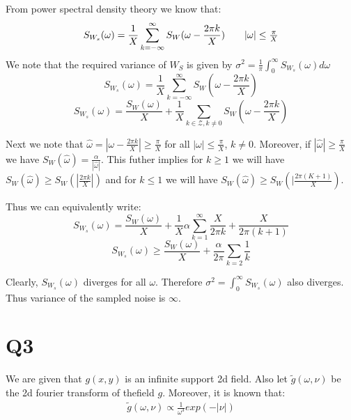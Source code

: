 \documentclass{article}
\begin{document}
From power spectral density theory we know that:
\begin{align}
  \label{eq:psd1}
  S_{W_s}(\omega) = \frac{1}{X}\sum_{k=-\infty}^{\infty}S_W(\omega - \frac{2\pi k}{X}) \tag*{$|\omega| \le \frac{\pi}{X}$}
\end{align}
We note that the required variance of $W_S$ is given by $\sigma^2 = \frac{1}{\pi} \int_{0}^{\infty}S_{W_s}(\omega)d\omega$
$$S_{W_s}(\omega) = \frac{1}{X} \sum_{k=-\infty}^{\infty}S_W(\omega - \frac{2\pi k}{X})$$
$$S_{W_s}(\omega) = \frac{S_W(\omega)}{X} + \frac{1}{X} \sum_{k \in \mathcal{Z}, k \ne 0} S_W(\omega - \frac{2 \pi k}{X})$$

Next we note that $\hat{\omega} = |\omega - \frac{2\pi k}{X}| \ge \frac{\pi}{X}$ for all $|\omega| \le \frac{\pi}{X}$, $k \ne 0$. Moreover, if $|\hat{\omega}| \ge \frac{\pi}{X}$ we have $S_W(\hat{\omega}) = \frac{\alpha}{|\hat{\omega}|}$. This futher implies for $k \ge 1$ we will have $S_W(\hat{\omega}) \ge S_W(|\frac{2\pi k}{X}|)$ and for $k \le 1$ we will have $S_W(\hat{\omega}) \ge S_W(|\frac{2 \pi (K+1)}{X})$.

Thus we can equivalently write:
$$S_{W_s}(\omega) = \frac{S_W(\omega)}{X} + \frac{1}{X} \alpha \sum_{k=1}^{\infty} \frac{X}{2\pi k} + \frac{X}{2\pi (k+1)}$$
$$S_{W_s}(\omega) \ge \frac{S_W(\omega)}{X} + \frac{\alpha}{2\pi} \sum_{k=2}\frac{1}{k}$$

Clearly, $S_{W_s}(\omega)$ diverges for all $\omega$. Therefore $\sigma^2 = \int_{0}^{\infty}S_{W_s}(\omega)$ also diverges. Thus variance of the sampled noise is $\infty$.



\section*{Q3}
We are given that $g(x, y)$ is an infinite support 2d field. Also let $\tilde{g}(\omega, \nu)$ be the 2d fourier transform of thefield $g$. Moreover, it is known that:
\begin{align}
  \label{eq:q3}
  \tilde{g}(\omega, \nu) \propto \frac{1}{\omega^3}exp(-|\nu|) \tag*{$|\omega| > 1, |\nu| > 1$}
\end{align}
\end{document}
